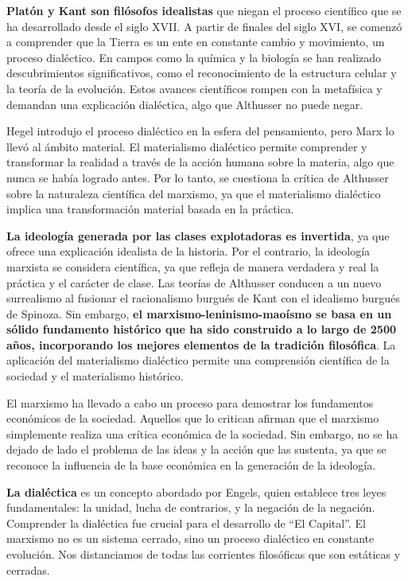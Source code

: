 \documentclass[
  jou,
  floatsintext,
  longtable,
  a4paper,
  nolmodern,
  notxfonts,
  notimes,
  12pt,
  colorlinks=true,linkcolor=blue,citecolor=blue,urlcolor=blue]{apa7}
\begin{document}
\textbf{Platón y Kant son filósofos idealistas} que niegan el proceso
científico que se ha desarrollado desde el siglo XVII. A partir de
finales del siglo XVI, se comenzó a comprender que la Tierra es un ente
en constante cambio y movimiento, un proceso dialéctico. En campos como
la química y la biología se han realizado descubrimientos
significativos, como el reconocimiento de la estructura celular y la
teoría de la evolución. Estos avances científicos rompen con la
metafísica y demandan una explicación dialéctica, algo que Althusser no
puede negar.

Hegel introdujo el proceso dialéctico en la esfera del pensamiento, pero
Marx lo llevó al ámbito material. El materialismo dialéctico permite
comprender y transformar la realidad a través de la acción humana sobre
la materia, algo que nunca se había logrado antes. Por lo tanto, se
cuestiona la crítica de Althusser sobre la naturaleza científica del
marxismo, ya que el materialismo dialéctico implica una transformación
material basada en la práctica.

\textbf{La ideología generada por las clases explotadoras es invertida},
ya que ofrece una explicación idealista de la historia. Por el
contrario, la ideología marxista se considera científica, ya que refleja
de manera verdadera y real la práctica y el carácter de clase. Las
teorías de Althusser conducen a un nuevo surrealismo al fusionar el
racionalismo burgués de Kant con el idealismo burgués de Spinoza. Sin
embargo, \textbf{el marxismo-leninismo-maoísmo se basa en un sólido
fundamento histórico que ha sido construido a lo largo de 2500 años,
incorporando los mejores elementos de la tradición filosófica}. La
aplicación del materialismo dialéctico permite una comprensión
científica de la sociedad y el materialismo histórico.

El marxismo ha llevado a cabo un proceso para demostrar los fundamentos
económicos de la sociedad. Aquellos que lo critican afirman que el
marxismo simplemente realiza una crítica económica de la sociedad. Sin
embargo, no se ha dejado de lado el problema de las ideas y la acción
que las sustenta, ya que se reconoce la influencia de la base económica
en la generación de la ideología.

\textbf{La dialéctica} es un concepto abordado por Engels, quien
establece tres leyes fundamentales: la unidad, lucha de contrarios, y la
negación de la negación. Comprender la dialéctica fue crucial para el
desarrollo de ``El Capital''. El marxismo no es un sistema cerrado, sino
un proceso dialéctico en constante evolución. Nos distanciamos de todas
las corrientes filosóficas que son estáticas y cerradas.
\end{document}
